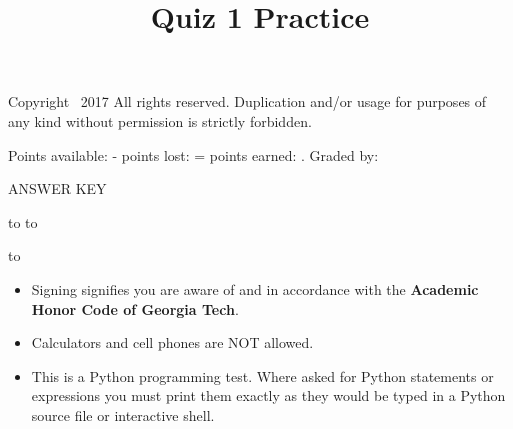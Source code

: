 \documentclass[addpoints,9pt]{exam}
\title{Quiz 1 Practice}
\date{}
\begin{document}
\maketitle
\thispagestyle{head}


\runningheader{}
              {\tiny Copyright \textcopyright\ 2017 All rights reserved. Duplication and/or usage for purposes of any kind without permission is strictly forbidden.}
              {}

              {}
              {Points available: \pointsonpage{\thepage} -
               points lost: \makebox[.5in]{\hrulefill} =
               points earned:  \makebox[.5in]{\hrulefill}.
              Graded by: \makebox[.5in]{\hrulefill}}


\ifprintanswers
\begin{center}
{\LARGE ANSWER KEY}
\end{center}
\else
\vspace{0.1in}
\hbox to \textwidth{Name (print clearly): \enspace\hrulefill}
\vspace{0.3in}
\hbox to \textwidth{Signature: \hrulefill}

\vspace{0.3in}
\hbox to \textwidth{T-Square username (gtg, gth, msmith3, etc): \enspace\hrulefill}

\fi

\vfill

\begin{itemize}
\item Signing signifies you are aware of and in accordance with the {\bf Academic Honor Code of Georgia Tech}.
\item Calculators and cell phones are NOT allowed.
\item This is a Python programming test.  Where asked for Python statements or expressions you must print them exactly as they would be typed in a Python source file or interactive shell.
\end{itemize}

\vfill

\addpoints
\end{document}
